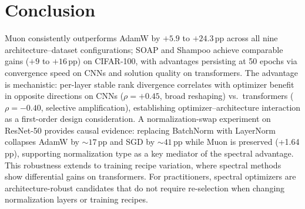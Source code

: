 \section{Conclusion}
\label{sec:conclusion}

Muon consistently outperforms AdamW by $+5.9$ to $+24.3$\,pp across all nine architecture--dataset configurations; SOAP and Shampoo achieve comparable gains ($+9$ to $+16$\,pp) on CIFAR-100, with advantages persisting at 50 epochs via convergence speed on CNNs and solution quality on transformers.
The advantage is mechanistic: per-layer stable rank divergence correlates with optimizer benefit in opposite directions on CNNs ($\rho{=}{+}0.45$, broad reshaping) vs.\ transformers ($\rho{=}{-}0.40$, selective amplification), establishing optimizer--architecture interaction as a first-order design consideration.
A normalization-swap experiment on ResNet-50 provides causal evidence: replacing BatchNorm with LayerNorm collapses AdamW by ${\sim}17$\,pp and SGD by ${\sim}41$\,pp while Muon is preserved (+1.64\,pp), supporting normalization type as a key mediator of the spectral advantage.
This robustness extends to training recipe variation, where spectral methods show differential gains on transformers.
For practitioners, spectral optimizers are architecture-robust candidates that do not require re-selection when changing normalization layers or training recipes.

